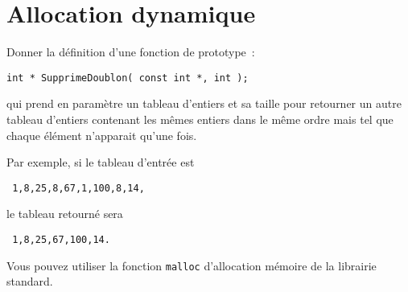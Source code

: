 \section{Allocation dynamique}
Donner la d\'efinition d'une fonction de prototype~:
\begin{verbatim}
int * SupprimeDoublon( const int *, int );
\end{verbatim}
qui prend en param\`etre un tableau d'entiers et sa taille pour 
retourner un autre tableau d'entiers contenant les m\^emes entiers
dans le m\^eme ordre mais tel que chaque \'el\'ement n'apparait qu'une
fois. 
\par
Par exemple, si le tableau d'entr\'ee
est
\begin{verbatim}
 1,8,25,8,67,1,100,8,14,
\end{verbatim}
le tableau retourn\'e sera
\begin{verbatim}
 1,8,25,67,100,14.
\end{verbatim}
\par\smallskip
Vous pouvez utiliser la fonction \verb+malloc+ d'allocation m\'emoire de la librairie standard.
\ifcorrection
\begin{correction}
  
\end{correction}
\fi